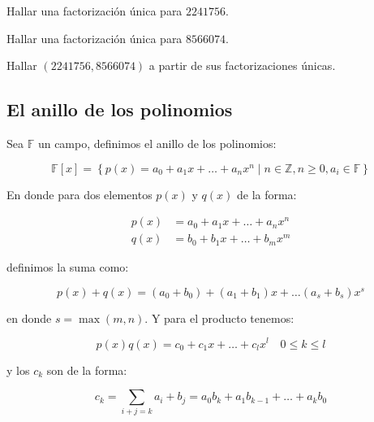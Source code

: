         \begin{ejemplo}
            Hallar una factorización única para $2241756$.

        \end{ejemplo}

        \begin{ejemplo}
            Hallar una factorización única para $8566074$.

        \end{ejemplo}

        \begin{ejemplo}
            Hallar $(2241756, 8566074)$ a partir de sus factorizaciones únicas.

        \end{ejemplo}
    \newpage
    \subsection{El anillo de los polinomios}

        \begin{definicion}
            Sea $\mathbb{F}$ un campo, definimos el anillo de los polinomios:

            \begin{equation}
                \mathbb{F}[x] = \left\{ p(x) = a_0 + a_1 x + \dots + a_n x^n \mid n \in \mathbb{Z}, n \geq 0, a_i \in \mathbb{F} \right\}
            \end{equation}

            En donde para dos elementos $p(x)$ y $q(x)$ de la forma:

            \begin{align*}
                p(x) &= a_0 + a_1 x + \dots + a_n x^n \\
                q(x) &= b_0 + b_1 x + \dots + b_m x^m 
            \end{align*}

            definimos la suma como:

            \begin{equation}
                p(x) + q(x) = (a_0 + b_0) + (a_1 + b_1) x + \dots (a_s + b_s) x^s
            \end{equation}

            en donde $s = \max{(m, n)}$. Y para el producto tenemos:

            \begin{equation}
                p(x)q(x) = c_0 + c_1 x + \dots + c_l x^l \quad 0 \leq k \leq l
            \end{equation}

            y los $c_k$ son de la forma:

            \begin{equation}
                c_k = \sum_{i+j = k} a_i + b_j = a_0 b_k + a_1 b_{k-1} + \dots + a_k b_0
            \end{equation}
        \end{definicion}

